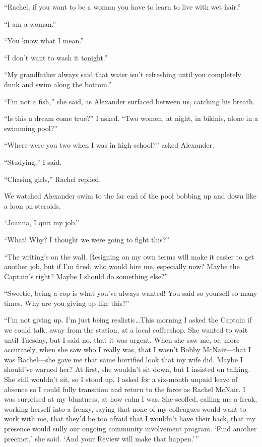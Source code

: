 ``Rachel, if you want to be a woman you have to learn to live with wet
hair.''

``I am a woman.''

``You know what I mean.''

``I don't want to wash it tonight.''

``My grandfather always said that water isn't refreshing until you
completely dunk and swim along the bottom.''

``I'm not a fish,'' she said, as Alexander surfaced between us, catching
his breath.

``Is this a dream come true?'' I asked. ``Two women, at night, in
bikinis, alone in a swimming pool?''

``Where were you two when I was in high school?'' asked Alexander.

``Studying,'' I said.

``Chasing girls,'' Rachel replied.

We watched Alexander swim to the far end of the pool bobbing up and down
like a loon on steroids.

``Joanna, I quit my job.''

``What! Why? I thought we were going to fight this?''

``The writing's on the wall. Resigning on my own terms will make it
easier to get another job, but if I'm fired, who would hire me,
especially now? Maybe the Captain's right? Maybe I should do something
else?''

``Sweetie, being a cop is what you've always wanted! You said so
yourself so many times. Why are you giving up like this?''

``I'm not giving up. I'm just being realistic\ldots This morning I asked
the Captain if we could talk, away from the station, at a local
coffeeshop. She wanted to wait until Tuesday, but I said no, that it was
urgent. When she saw me, or, more accurately, when she saw who I really
was, that I wasn't Bobby McNair---that I was Rachel---she gave me that
same horrified look that my wife did. Maybe I should've warned her? At
first, she wouldn't sit down, but I insisted on talking. She still
wouldn't sit, so I stood up. I asked for a six-month unpaid leave of
absence so I could fully transition and return to the force as Rachel
McNair. I was surprised at my bluntness, at how calm I was. She scoffed,
calling me a freak, working herself into a frenzy, saying that none of
my colleagues would want to work with me, that they'd be too afraid that
I wouldn't have their back, that my presence would sully our ongoing
community involvement program. `Find another precinct,' she said. `And
your Review will make that happen.'\,''

